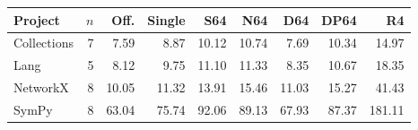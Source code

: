 \begin{tabular}{lrrrrrrrr}
\toprule
Project & $n$ & Off. & Single & S64 & N64 & D64 & DP64 & R4 \\
\midrule
Collections & 7 & 7.59 & 8.87 & 10.12 & 10.74 & 7.69 & 10.34 & 14.97 \\
Lang & 5 & 8.12 & 9.75 & 11.10 & 11.33 & 8.35 & 10.67 & 18.35 \\
NetworkX & 8 & 10.05 & 11.32 & 13.91 & 15.46 & 11.03 & 15.27 & 41.43 \\
SymPy & 8 & 63.04 & 75.74 & 92.06 & 89.13 & 67.93 & 87.37 & 181.11 \\
\bottomrule
\end{tabular}
